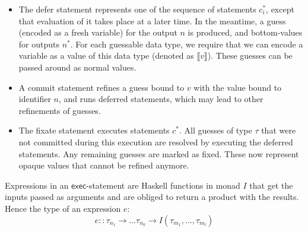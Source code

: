 \documentclass[preprint,natbib]{sigplanconf}
\newcommand{\Conid}[1]{\mathit{#1}}
\newcommand{\Varid}[1]{\mathit{#1}}
\newcommand\Statement{c}
\newcommand\Statements{\Statement^*}
\newcommand\Type{\tau}
\newcommand\Idents[1]{{#1}^{\!*}}
\newcommand\Execution{\mathsf{exec}}
\newcommand\sembrack[1]{\llbracket #1 \rrbracket}
\begin{document}
    \begin{itemize}
    \item The defer statement represents one of the sequence of statements $\Statements_i$, except that evaluation of it
      takes place at a later time. In the meantime, a guess (encoded as a fresh variable) for the output $n$ is
      produced, and bottom-values for outputs $\Idents{n}$. For each guessable data type, we require that we can encode a
      variable as a value of this data type (denoted as $\sembrack{v}$). These guesses can be passed around as normal values.
    \item A commit statement refines a guess bound to $v$ with the value bound to identifier $n$, and runs
      deferred statements, which may lead to other refinements of guesses.
    \item The fixate statement executes statements $\Statements$. All guesses of type $\Type$ that were not committed during
      this execution are resolved by executing the deferred statements. Any remaining guesses are marked as fixed. These
      now represent opaque values that cannot be refined anymore.
    \end{itemize}
    
    Expressions in an $\Execution$-statement are Haskell functions in monad \ensuremath{\Conid{I}} that get the inputs passed as arguments and are
    obliged to return a product with the results. Hence the type of an expression \ensuremath{\Varid{e}}:
    \begin{displaymath}
      e :: \tau_{n_1} \rightarrow \ldots \tau_{n_k} \rightarrow I (\tau_{m_1}, \ldots, \tau_{m_l})
    \end{displaymath}
    
\end{document}
